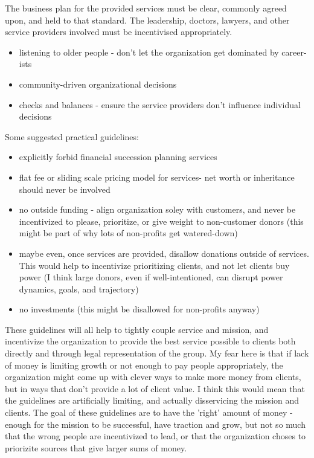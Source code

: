 \documentclass{proposalnsf}
\begin{document}
The business plan for the provided services must be clear, commonly agreed upon, and held to that standard. The leadership, doctors, lawyers, and other service providers involved must be incentivised appropriately.

\bigskip
{}
      \begin{itemize}
        \item{listening to older people - don't let the organization get dominated by career-ists}
        \item{community-driven organizational decisions}
        \item{checks and balances - ensure the service providers don't influence individual decisions}
      \end{itemize}


Some suggested practical guidelines:
      \begin{itemize}
        \item{explicitly forbid financial succession planning services}
        \item{flat fee or sliding scale pricing model for services- net worth or inheritance should never be involved}
        \item{no outside funding - align organization soley with customers, and never be incentivized to please, prioritize, or give weight to non-customer donors (this might be part of why lots of non-profits get watered-down)}
        \item{    maybe even, once services are provided, disallow donations outside of services. This would help to incentivize prioritizing clients, and not let clients buy power (I think large donors, even if well-intentioned, can disrupt power dynamics, goals, and trajectory)}
        \item{no investments (this might be disallowed for non-profits anyway)}
      \end{itemize}


These guidelines will all help to tightly couple service and mission, and incentivize the organization to provide the best service possible to clients both directly and through legal representation of the group. My fear here is that if lack of money is limiting growth or not enough to pay people appropriately, the organization might come up with clever ways to make more money from clients, but in ways that don't provide a lot of client value. I think this would mean that the guidelines are artificially limiting, and actually disservicing the mission and clients. The goal of these guidelines are to have the 'right' amount of money - enough for the mission to be successful, have traction and grow, but not so much that the wrong people are incentivized to lead, or that the organization choses to priorizite sources that give larger sums of money.
\end{document}
